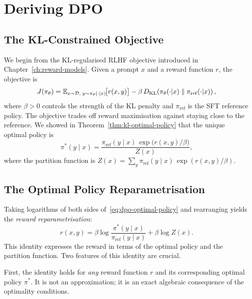 \section{Deriving DPO}
\label{sec:dpo-derivation}

\subsection{The KL-Constrained Objective}

We begin from the KL-regularised RLHF objective introduced in Chapter~\ref{ch:reward-models}. Given a prompt $x$ and a reward function $r$, the objective is
\begin{equation}
\label{eq:dpo-rlhf-obj}
J(\pi_\theta) = \operatorname{\mathbb{E}}_{x \sim \mathcal{D},\; y \sim \pi_\theta(\cdot|x)}\!\bigl[r(x, y)\bigr]
- \beta\,D_{\mathrm{KL}}\!\left(\pi_\theta(\cdot|x)\;\|\;\pi_\mathrm{ref}(\cdot|x)\right),
\end{equation}
where $\beta > 0$ controls the strength of the KL penalty and $\pi_\mathrm{ref}$ is the SFT reference policy. The objective trades off reward maximisation against staying close to the reference. We showed in Theorem~\ref{thm:kl-optimal-policy} that the unique optimal policy is
\begin{equation}
\label{eq:dpo-optimal-policy}
\pi^*(y \mid x) = \frac{\pi_\mathrm{ref}(y \mid x)\,\exp\!\bigl(r(x, y)/\beta\bigr)}{Z(x)},
\end{equation}
where the partition function is $Z(x) = \sum_y \pi_\mathrm{ref}(y \mid x)\,\exp(r(x, y)/\beta)$.

\subsection{The Optimal Policy Reparametrisation}

Taking logarithms of both sides of~\eqref{eq:dpo-optimal-policy} and rearranging yields the \emph{reward reparametrisation}:
\begin{equation}
\label{eq:dpo-reparam}
r(x, y) = \beta\log\frac{\pi^*(y \mid x)}{\pi_\mathrm{ref}(y \mid x)} + \beta\log Z(x).
\end{equation}
This identity expresses the reward in terms of the optimal policy and the partition function. Two features of this identity are crucial.

First, the identity holds for \emph{any} reward function $r$ and its corresponding optimal policy $\pi^*$. It is not an approximation; it is an exact algebraic consequence of the optimality conditions.

